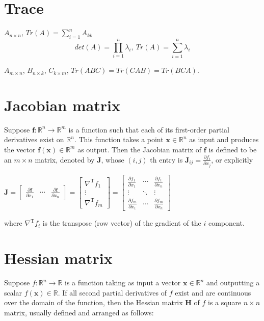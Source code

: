 \documentclass[11pt]{elegantbook}
\begin{document}
\section{Trace}
$A_{n\times n}$, $Tr(A)=\sum_{i=1}^nA_{kk}$
$$det(A)=\prod_{i=1}^n\lambda_i,\ Tr(A)=\sum_{i=1}^n\lambda_i$$
\begin{proposition}
$A_{m\times n}$, $B_{n\times k}$, $C_{k\times m}$, $Tr(ABC)=Tr(CAB)=Tr(BCA)$.
\end{proposition}







\section{Jacobian matrix}
Suppose $\mathbf{f}: \mathbb{R}^{n} \rightarrow \mathbb{R}^{m}$ is a function such that each of its first-order partial derivatives exist on $\mathbb{R}^{n}.$ This function takes a point $\mathbf{x} \in \mathbb{R}^{n}$ as input and produces the vector $\mathbf{f}(\mathbf{x}) \in \mathbb{R}^{m}$ as output. Then the Jacobian matrix of $\mathbf{f}$ is defined to be an $m \times n$ matrix, denoted by $\mathbf{J}$, whose $(i, j)$ th entry is $\mathbf{J}_{i j}=\frac{\partial f_{i}}{\partial x_{j}}$, or explicitly

$
\mathbf{J}=\left[\begin{array}{ccc}
\frac{\partial \mathbf{f}}{\partial x_{1}} & \cdots & \frac{\partial \mathbf{f}}{\partial x_{n}}
\end{array}\right]=\left[\begin{array}{c}
\nabla^{\mathrm{T}} f_{1} \\
\vdots \\
\nabla^{\mathrm{T}} f_{m}
\end{array}\right]=\left[\begin{array}{ccc}
\frac{\partial f_{1}}{\partial x_{1}} & \cdots & \frac{\partial f_{1}}{\partial x_{n}} \\
\vdots & \ddots & \vdots \\
\frac{\partial f_{m}}{\partial x_{1}} & \cdots & \frac{\partial f_{m}}{\partial x_{n}}
\end{array}\right]
$

where $\nabla^{\mathrm{T}} f_{i}$ is the transpose (row vector) of the gradient of the $i$ component.

\section{Hessian matrix}
Suppose $f: \mathbb{R}^{n} \rightarrow \mathbb{R}$ is a function taking as input a vector $\mathbf{x} \in \mathbb{R}^{n}$ and outputting a scalar $f(\mathbf{x}) \in \mathbb{R}$. If all second partial derivatives of $f$ exist and are continuous over the domain of the function, then the Hessian matrix $\mathbf{H}$ of $f$ is a square $n \times n$ matrix, usually defined and arranged as follows:
\end{document}
